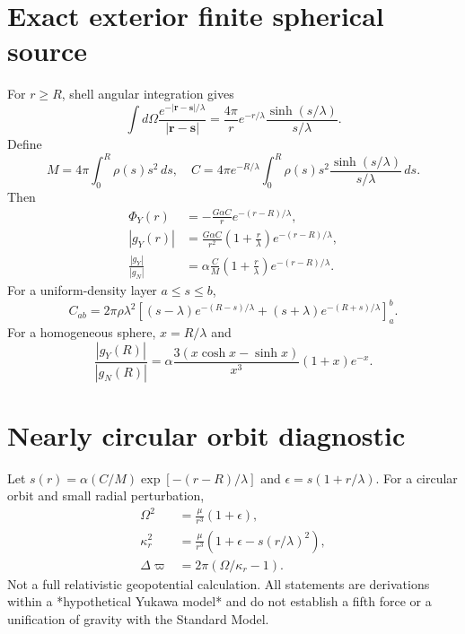 \documentclass[11pt]{article}
\begin{document}
\section{Exact exterior finite spherical source}
For $r\ge R$, shell angular integration gives
\begin{equation}
\int d\Omega\frac{e^{-|\mathbf r-\mathbf s|/\lambda}}{|\mathbf r-\mathbf s|}
=\frac{4\pi}{r}e^{-r/\lambda}\frac{\sinh(s/\lambda)}{s/\lambda}.
\end{equation}
Define
\begin{equation}
M=4\pi\int_0^R\rho(s)s^2\,ds,\quad
C=4\pi e^{-R/\lambda}\int_0^R\rho(s)s^2\frac{\sinh(s/\lambda)}{s/\lambda}\,ds.
\end{equation}
Then
\begin{align}
\Phi_Y(r)&=-\frac{G\alpha C}{r}e^{-(r-R)/\lambda},\\
|g_Y(r)|&=\frac{G\alpha C}{r^2}\left(1+\frac r\lambda\right)e^{-(r-R)/\lambda},\\
\frac{|g_Y|}{|g_N|}&=\alpha\frac{C}{M}\left(1+\frac r\lambda\right)e^{-(r-R)/\lambda}.
\end{align}
For a uniform-density layer $a\le s\le b$,
\begin{equation}
C_{ab}=2\pi\rho\lambda^2\left[(s-\lambda)e^{-(R-s)/\lambda}+(s+\lambda)e^{-(R+s)/\lambda}\right]_{a}^{b}.
\end{equation}
For a homogeneous sphere, $x=R/\lambda$ and
\begin{equation}
\frac{|g_Y(R)|}{|g_N(R)|}=\alpha\frac{3(x\cosh x-\sinh x)}{x^3}(1+x)e^{-x}.
\end{equation}
\section{Nearly circular orbit diagnostic}
Let $s(r)=\alpha(C/M)\exp[-(r-R)/\lambda]$ and $\epsilon=s(1+r/\lambda)$.
For a circular orbit and small radial perturbation,
\begin{align}
\Omega^2&=\frac{\mu}{r^3}(1+\epsilon),\\
\kappa_r^2&=\frac{\mu}{r^3}\left(1+\epsilon-s(r/\lambda)^2\right),\\
\Delta\varpi&=2\pi(\Omega/\kappa_r-1).
\end{align}
Not a full relativistic geopotential calculation.
All statements are derivations within a *hypothetical Yukawa model* and do not establish a fifth force or a unification of gravity with the Standard Model.
\end{document}
